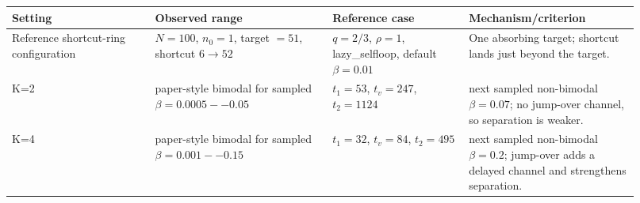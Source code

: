 \begin{tabular}{p{0.21\linewidth}p{0.26\linewidth}p{0.20\linewidth}p{0.25\linewidth}}
\toprule
Setting & Observed range & Reference case & Mechanism/criterion \\
\midrule
Reference shortcut-ring configuration &
\(N=100\), \(n_0=1\), target \(=51\), shortcut \(6\to52\) &
\(q=2/3\), \(\rho=1\), lazy\_selfloop, default \(\beta=0.01\) &
One absorbing target; shortcut lands just beyond the target. \\
K=2 &
paper-style bimodal for sampled \(\beta=0.0005--0.05\) &
\(t_1=53\), \(t_v=247\), \(t_2=1124\) &
next sampled non-bimodal \(\beta=0.07\); no jump-over channel, so separation is weaker. \\
K=4 &
paper-style bimodal for sampled \(\beta=0.001--0.15\) &
\(t_1=32\), \(t_v=84\), \(t_2=495\) &
next sampled non-bimodal \(\beta=0.2\); jump-over adds a delayed channel and strengthens separation. \\
\bottomrule
\end{tabular}

